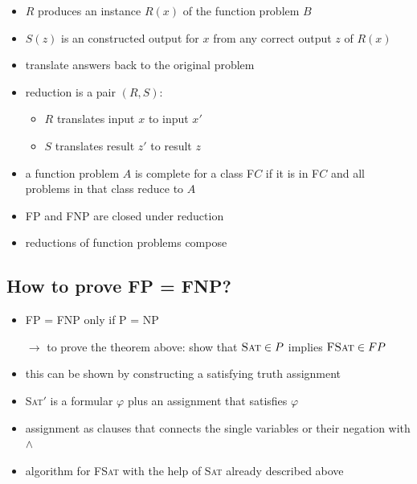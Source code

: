 \documentclass[a4]{scrartcl}
\begin{document}
\begin{itemize}
\item $R$ produces an instance $R(x)$ of the function problem $B$
\item $S(z)$ is an constructed output for $x$ from any correct output $z$ of $R(x)$
\item translate answers back to the original problem
\item reduction is a pair $(R,S)$:
\begin{itemize}
\item $R$ translates input $x$ to input $x'$
\item $S$ translates result $z'$ to result $z$
\end{itemize}

\item a function problem $A$ is complete for a class F$C$ if it is in F$C$ and all problems in that class reduce to $A$
\item FP and FNP are closed under reduction
\item reductions of function problems compose
\end{itemize}











\subsection*{How to prove FP = FNP?}



\begin{itemize}
\item FP = FNP only if P = NP
\item[$\rightarrow$] to prove the theorem above: show that $\textsc{Sat} \in P$ implies $\textsc{FSat} \in FP$
\item this can be shown by constructing a satisfying truth assignment
\item \textsc{Sat$'$} is a formular $\varphi$ plus an assignment that satisfies $\varphi$
\item assignment as clauses that connects the single variables or their negation with $\land$
\item algorithm for \textsc{FSat} with the help of \textsc{Sat} already described above
\end{itemize}
\end{document}
